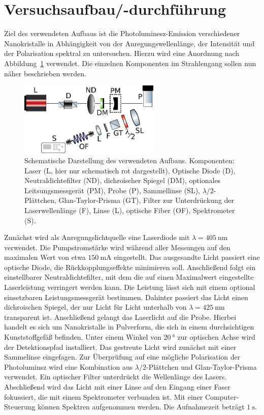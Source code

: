 \section{Versuchsaufbau/-durchführung}
Ziel des verwendeten Aufbaus ist die Photoluminesz-Emission verschiedener Nanokristalle in Abhängigkeit
von der Anregungswellenlänge, der Intensität und der Polarisation spektral zu untersuchen.
Hierzu wird eine Anordnung nach Abbildung~\ref{fig: aufbau} verwendet. Die einzelnen Komponenten
im Strahlengang sollen nun näher beschrieben werden.

\begin{figure}
  \centering
  \includegraphics[width = 0.6\textwidth]{pics/setup.pdf}
  \caption{Schematische Darstellung des verwendeten Aufbaus. Komponenten: Laser (L, hier nur schematisch rot dargestellt), Optische Diode (D), Neutraldichtefilter (ND),
  dichroischer Spiegel (DM), optionales Leitsungsmessgerät (PM), Probe (P), Sammellinse (SL), $\lambda / 2$-Plättchen, Glan-Taylor-Prisma (GT), Filter zur Unterdrückung
  der Laserwellenlänge (F), Linse (L), optische Fiber (OF), Spektrometer (S).}
  \label{fig: aufbau}
\end{figure}

Zunächst wird als Anregungslichtquelle eine Laserdiode mit $\lambda = \SI{405}{\nano\meter}$ verwendet.
Die Pumpstromstärke wird während aller Messungen auf den maximalen Wert von etwa $\SI{150}{\milli\ampere}$ eingestellt.
Das ausgesandte Licht passiert eine optische Diode, die Rückkopplungseffekte minimieren soll.
Anschließend folgt ein einstellbarer Neutraldichtefilter, mit dem die auf einen Maximalwert eingestellte Laserleistung
verringert werden kann. Die Leistung lässt sich mit einem optional einsetzbaren Leistungsmessgerät bestimmen.
Dahinter passiert das Licht einen
dichroischen Spiegel, der nur Licht für Licht unterhalb von
$\lambda = \SI{425}{\nano\meter}$ transparent ist.
Anschließend gelangt das Laserlicht auf die Probe. Hierbei handelt es sich um Nanokristalle in Pulverform, die sich in
einem durchsichtigen Kunststoffgefäß befinden. Unter einem Winkel von $\SI{20}{\degree}$ zur optischen Achse wird der
Detektionspfad installiert. Das gestreute Licht wird zunächst mit einer Sammelinse eingefagen. Zur Überprüfung auf eine
mögliche Polarisation der Photoluminsz wird eine Kombination aus $\lambda / 2$-Plättchen und
Glan-Taylor-Prisma verwendet. Ein optischer Filter unterdrückt die Wellenlänge des Lasers.
Abschließend wird das Licht mit einer Linse auf den Eingang einer Faser fokussiert, die mit einem
Spektrometer verbunden ist. Mit einer Computer-Steuerung können Spektren aufgenommen werden. Die Aufnahmezeit beträgt
$\SI{1}{\second}$.

